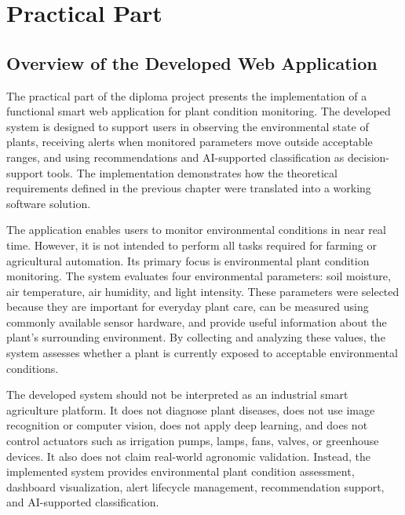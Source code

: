 \chapter{Practical Part}
\label{ch:practical-part}

\section{Overview of the Developed Web Application}
\label{sec:overview-developed-web-application}

The practical part of the diploma project presents the implementation of a functional smart web application for plant condition monitoring. The developed system is designed to support users in observing the environmental state of plants, receiving alerts when monitored parameters move outside acceptable ranges, and using recommendations and AI-supported classification as decision-support tools. The implementation demonstrates how the theoretical requirements defined in the previous chapter were translated into a working software solution.

The application enables users to monitor environmental conditions in near real time. However, it is not intended to perform all tasks required for farming or agricultural automation. Its primary focus is environmental plant condition monitoring. The system evaluates four environmental parameters: soil moisture, air temperature, air humidity, and light intensity. These parameters were selected because they are important for everyday plant care, can be measured using commonly available sensor hardware, and provide useful information about the plant's surrounding environment. By collecting and analyzing these values, the system assesses whether a plant is currently exposed to acceptable environmental conditions.

The developed system should not be interpreted as an industrial smart agriculture platform. It does not diagnose plant diseases, does not use image recognition or computer vision, does not apply deep learning, and does not control actuators such as irrigation pumps, lamps, fans, valves, or greenhouse devices. It also does not claim real-world agronomic validation. Instead, the implemented system provides environmental plant condition assessment, dashboard visualization, alert lifecycle management, recommendation support, and AI-supported classification.


